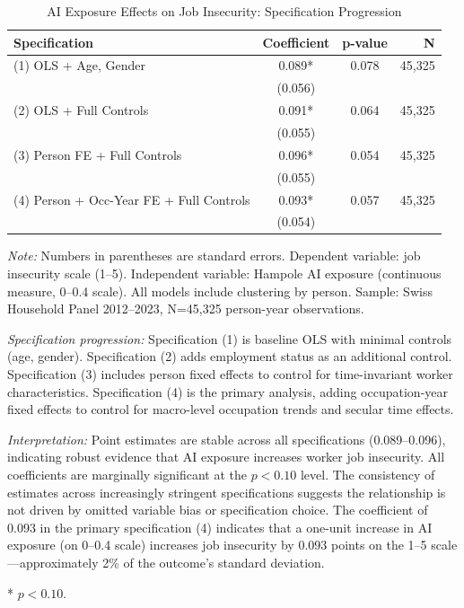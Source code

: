 
\begin{table}[h]
\centering
\caption{AI Exposure Effects on Job Insecurity: Specification Progression}
\label{tab:insecurity_specs}
\begin{tabular}{@{\extracolsep{0.5em}}lccr@{}}
\toprule
\multicolumn{1}{l}{\textbf{Specification}} &
\multicolumn{1}{c}{\textbf{Coefficient}} &
\multicolumn{1}{c}{\textbf{p-value}} &
\multicolumn{1}{r}{\textbf{N}} \\
\midrule
(1) OLS + Age, Gender &
0.089* &
0.078 &
45,325 \\
& (0.056) & & \\
(2) OLS + Full Controls &
0.091* &
0.064 &
45,325 \\
& (0.055) & & \\
(3) Person FE + Full Controls &
0.096* &
0.054 &
45,325 \\
& (0.055) & & \\
(4) Person + Occ-Year FE + Full Controls &
0.093* &
0.057 &
45,325 \\
& (0.054) & & \\
\bottomrule
\end{tabular}

\begin{flushleft}
\footnotesize
\textit{Note:} Numbers in parentheses are standard errors. Dependent variable: job insecurity scale (1--5).
Independent variable: Hampole AI exposure (continuous measure, 0--0.4 scale).
All models include clustering by person.
Sample: Swiss Household Panel 2012--2023, N=45,325 person-year observations.

\textit{Specification progression:} Specification (1) is baseline OLS with minimal controls (age, gender).
Specification (2) adds employment status as an additional control. Specification (3) includes person fixed effects to control for time-invariant worker characteristics.
Specification (4) is the primary analysis, adding occupation-year fixed effects to control for macro-level occupation trends and secular time effects.

\textit{Interpretation:} Point estimates are stable across all specifications (0.089--0.096), indicating robust evidence that AI exposure increases worker job insecurity.
All coefficients are marginally significant at the $p<0.10$ level. The consistency of estimates across increasingly stringent specifications suggests the relationship is not driven by omitted variable bias or specification choice.
The coefficient of 0.093 in the primary specification (4) indicates that a one-unit increase in AI exposure (on 0--0.4 scale) increases job insecurity by 0.093 points on the 1--5 scale---approximately 2\% of the outcome's standard deviation.

* $p < 0.10$.
\end{flushleft}
\end{table}
